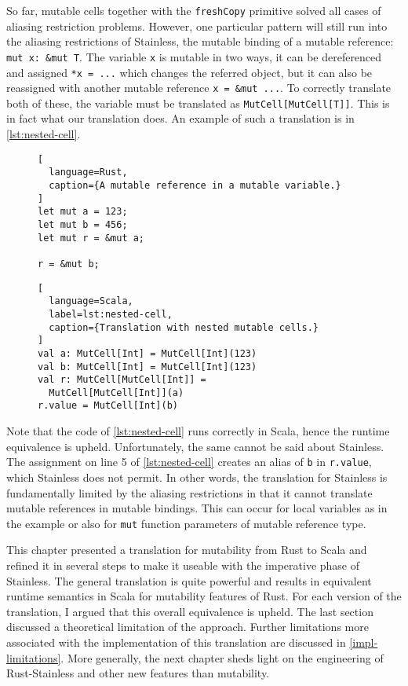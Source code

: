 So far, mutable cells together with the \lstinline!freshCopy! primitive solved
all cases of aliasing restriction problems. However, one particular pattern will
still run into the aliasing restrictions of Stainless, the mutable binding of a
mutable reference: \passthrough{\lstinline!mut x: &mut T!}. The variable
\lstinline!x! is mutable in two ways, it can be dereferenced and assigned
\lstinline!*x = ...! which changes the referred object, but it can also be
reassigned with another mutable reference \lstinline!x = &mut ...!. To correctly
translate both of these, the variable must be translated as
\lstinline!MutCell[MutCell[T]]!. This is in fact what our translation does. An
example of such a translation is in \autoref{lst:nested-cell}.

\begin{figure}
\noindent\begin{minipage}[t]{.35\textwidth}
\begin{lstlisting}[
  language=Rust,
  caption={A mutable reference in a mutable variable.}
]
let mut a = 123;
let mut b = 456;
let mut r = &mut a;

r = &mut b;
\end{lstlisting}
\end{minipage}\hfill
\begin{minipage}[t]{.6\textwidth}
\begin{lstlisting}[
  language=Scala,
  label=lst:nested-cell,
  caption={Translation with nested mutable cells.}
]
val a: MutCell[Int] = MutCell[Int](123)
val b: MutCell[Int] = MutCell[Int](123)
val r: MutCell[MutCell[Int]] =
  MutCell[MutCell[Int]](a)
r.value = MutCell[Int](b)
\end{lstlisting}
\end{minipage}
\end{figure}

Note that the code of \autoref{lst:nested-cell} runs correctly in Scala, hence
the runtime equivalence is upheld. Unfortunately, the same cannot be said about
Stainless. The assignment on line 5 of \autoref{lst:nested-cell} creates an
alias of \lstinline!b! in \lstinline!r.value!, which Stainless does not permit.
In other words, the translation for Stainless is fundamentally limited by the
aliasing restrictions in that it cannot translate mutable references in mutable
bindings. This can occur for local variables as in the example or also for
\lstinline!mut! function parameters of mutable reference type.

\hfill \break \noindent This chapter presented a translation for mutability from
Rust to Scala and refined it in several steps to make it useable with the
imperative phase of Stainless. The general translation is quite powerful and
results in equivalent runtime semantics in Scala for mutability features of
Rust. For each version of the translation, I argued that this overall
equivalence is upheld. The last section discussed a theoretical limitation of
the approach. Further limitations more associated with the implementation of
this translation are discussed in \autoref{impl-limitations}. More generally,
the next chapter sheds light on the engineering of Rust-Stainless and other new
features than mutability.
